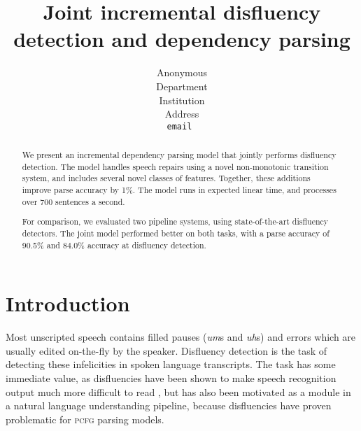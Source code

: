 \documentclass[11pt,letterpaper]{article}
\title{Joint incremental disfluency detection and dependency parsing}
\author{
	Anonymous\\
  	Department\\
  	Institution\\
  	Address\\
  {\tt \small email }\\
}
\date{}
\newcommand{\pcfg}{\textsc{pcfg}\xspace}
\begin{document}
\maketitle
\begin{abstract}

We present an incremental dependency parsing model that jointly performs
disfluency detection.  The model handles speech repairs using a novel non-monotonic
transition system, and includes several novel classes of features.  Together, these
additions improve parse accuracy by 1\%.  The model runs in expected linear time,
and processes over 700 sentences a second.

For comparison, we evaluated two pipeline systems, using state-of-the-art disfluency
detectors.  The joint model performed better on both tasks,
with a parse accuracy of 90.5\% and 84.0\% accuracy at disfluency detection.

\end{abstract}

\section{Introduction}

Most unscripted speech contains filled pauses (\emph{um}s and \emph{uh}s) and
errors which are usually edited on-the-fly by the speaker. Disfluency detection
is the task of detecting these infelicities in spoken language transcripts. The
task has some immediate value, as disfluencies have been shown to make speech
recognition output much more difficult to read \citep{jones:03}, but has also
been motivated as a module in a natural language understanding pipeline, because
disfluencies have proven problematic for \pcfg parsing models.


\end{document}
